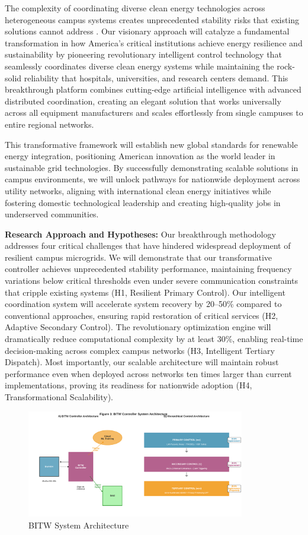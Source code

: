 \documentclass[12pt]{article}
\begin{document}
The complexity of coordinating diverse clean energy technologies across heterogeneous campus systems creates unprecedented stability risks that existing solutions cannot address \cite{molina2020, katiraei2008}. Our visionary approach will catalyze a fundamental transformation in how America's critical institutions achieve energy resilience and sustainability by pioneering revolutionary intelligent control technology that seamlessly coordinates diverse clean energy systems while maintaining the rock-solid reliability that hospitals, universities, and research centers demand. This breakthrough platform combines cutting-edge artificial intelligence with advanced distributed coordination, creating an elegant solution that works universally across all equipment manufacturers and scales effortlessly from single campuses to entire regional networks.

This transformative framework will establish new global standards for renewable energy integration, positioning American innovation as the world leader in sustainable grid technologies. By successfully demonstrating scalable solutions in campus environments, we will unlock pathways for nationwide deployment across utility networks, aligning with international clean energy initiatives while fostering domestic technological leadership and creating high-quality jobs in underserved communities.

\textbf{Research Approach and Hypotheses:} Our breakthrough methodology addresses four critical challenges that have hindered widespread deployment of resilient campus microgrids. We will demonstrate that our transformative controller achieves unprecedented stability performance, maintaining frequency variations below critical thresholds even under severe communication constraints that cripple existing systems (H1, Resilient Primary Control). Our intelligent coordination system will accelerate system recovery by 20--50\% compared to conventional approaches, ensuring rapid restoration of critical services (H2, Adaptive Secondary Control). The revolutionary optimization engine will dramatically reduce computational complexity by at least 30\%, enabling real-time decision-making across complex campus networks (H3, Intelligent Tertiary Dispatch). Most importantly, our scalable architecture will maintain robust performance even when deployed across networks ten times larger than current implementations, proving its readiness for nationwide adoption (H4, Transformational Scalability).

\begin{figure}[H]
\centering
\includegraphics[width=0.85\textwidth]{figure3_system_architecture.pdf}
\caption{BITW System Architecture}
\end{figure}
\end{document}
